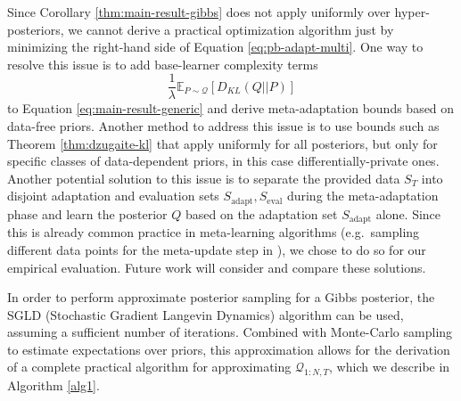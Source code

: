 \documentclass{article}
\theoremstyle{definition}
\newcommand{\Expect}[2]{\mathbb{E}_{#1}\left [#2 \right ]}
\begin{document}
Since Corollary \ref{thm:main-result-gibbs} does not apply uniformly over hyper-posteriors, we cannot derive a practical optimization algorithm just by minimizing the right-hand side of   Equation \ref{eq:pb-adapt-multi}. 
One way to resolve this issue is to add base-learner complexity terms $$\frac{1}{\lambda}\Expect{P\sim \mathcal{Q}}{D_{KL}(Q||P)}$$ to Equation \ref{eq:main-result-generic} and derive meta-adaptation bounds based on data-free priors.
Another method to address this issue is to use bounds such as Theorem \ref{thm:dzugaite-kl} \citep{Dziugaite2018} that apply uniformly for all posteriors, but only for specific classes of data-dependent priors, in this case differentially-private ones.
Another potential solution to this issue is to separate the provided data $S_T$ into disjoint adaptation and evaluation sets $S_{\mathrm{adapt}},S_{\mathrm{eval}}$ during the meta-adaptation phase and learn the posterior $Q$ based on the adaptation set $S_{\mathrm{adapt}}$ alone. Since this is already common practice in meta-learning algorithms (e.g.\ sampling different data points for the meta-update step in \citet{Finn2017} ), we chose to do so for our empirical evaluation. Future work will consider and compare these solutions.

In order to perform approximate posterior sampling for a Gibbs posterior, the SGLD (Stochastic Gradient Langevin Dynamics) algorithm \citep{Welling2011} can be used, assuming a sufficient number of iterations.
Combined with Monte-Carlo sampling to estimate expectations over priors, 
this approximation allows for the derivation of a complete practical algorithm for approximating $\mathcal{Q}_{1:N,T}$, which we describe in Algorithm \ref{alg1}. 
\end{document}
